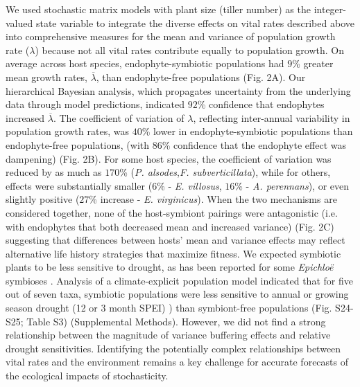 \documentclass[12pt]{article}
\begin{document}
We used stochastic matrix models with plant size (tiller number) as the integer-valued state variable to integrate the diverse effects on vital rates described above into comprehensive measures for the mean and variance of population growth rate ($\lambda$) because not all vital rates contribute equally to population growth.
On average across host species, endophyte-symbiotic populations had $9$\% greater mean growth rates, $\overline{\lambda}$, than endophyte-free populations (Fig. 2A). 
Our hierarchical Bayesian analysis, which propagates uncertainty from the underlying data through model predictions, indicated $92$\% confidence that endophytes increased $\overline{\lambda}$.
The coefficient of variation of $\lambda$, reflecting inter-annual variability in population growth rates, was $40$\% lower in endophyte-symbiotic populations than endophyte-free populations, (with $86$\% confidence that the endophyte effect was dampening) (Fig. 2B).
For some host species, the coefficient of variation was  reduced by as much as $170$\% (\emph{P. alsodes},\emph{F. subverticillata}), while for others, effects were substantially smaller ($6$\% - \emph{E. villosus}, $16$\% - \emph{A. perennans}), or even slightly positive  ($27$\% increase - \emph{E. virginicus}).
When the two mechanisms are considered together, none of the host-symbiont pairings were antagonistic (i.e. with endophytes that both decreased mean and increased variance) (Fig. 2C) suggesting that differences between hosts' mean and variance effects may reflect alternative life history strategies that maximize fitness.
We expected symbiotic plants to be less sensitive to drought, as has been reported for some \emph{Epichlo\"{e}} symbioses \cite{decunta2021systematic}.
Analysis of a climate-explicit population model indicated that for five out of seven taxa, symbiotic populations were less sensitive to annual or growing season drought (12 or 3 month SPEI) \cite{vicente2010multiscalar}) than symbiont-free populations (Fig. S24-S25; Table S3) (Supplemental Methods).
However, we did not find a strong relationship between the magnitude of variance buffering effects and relative drought sensitivities. 
Identifying the potentially complex relationships between vital rates and the environment remains a key challenge for accurate forecasts of the ecological impacts of stochasticity.
\end{document}
